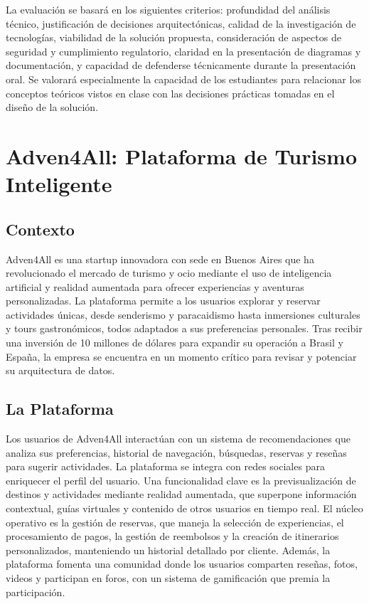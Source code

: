 \documentclass[12pt]{article}
\begin{document}
La evaluación se basará en los siguientes criterios: profundidad del análisis técnico, justificación de decisiones arquitectónicas, calidad de la investigación de tecnologías, viabilidad de la solución propuesta, consideración de aspectos de seguridad y cumplimiento regulatorio, claridad en la presentación de diagramas y documentación, y capacidad de defenderse técnicamente durante la presentación oral. Se valorará especialmente la capacidad de los estudiantes para relacionar los conceptos teóricos vistos en clase con las decisiones prácticas tomadas en el diseño de la solución.

\newpage

\section{Adven4All: Plataforma de Turismo Inteligente}

\subsection{Contexto}
Adven4All es una startup innovadora con sede en Buenos Aires que ha revolucionado el mercado de turismo y ocio mediante el uso de inteligencia artificial y realidad aumentada para ofrecer experiencias y aventuras personalizadas. La plataforma permite a los usuarios explorar y reservar actividades únicas, desde senderismo y paracaidismo hasta inmersiones culturales y tours gastronómicos, todos adaptados a sus preferencias personales. Tras recibir una inversión de 10 millones de dólares para expandir su operación a Brasil y España, la empresa se encuentra en un momento crítico para revisar y potenciar su arquitectura de datos.

\subsection{La Plataforma}
Los usuarios de Adven4All interactúan con un sistema de recomendaciones que analiza sus preferencias, historial de navegación, búsquedas, reservas y reseñas para sugerir actividades. La plataforma se integra con redes sociales para enriquecer el perfil del usuario. Una funcionalidad clave es la previsualización de destinos y actividades mediante realidad aumentada, que superpone información contextual, guías virtuales y contenido de otros usuarios en tiempo real. El núcleo operativo es la gestión de reservas, que maneja la selección de experiencias, el procesamiento de pagos, la gestión de reembolsos y la creación de itinerarios personalizados, manteniendo un historial detallado por cliente. Además, la plataforma fomenta una comunidad donde los usuarios comparten reseñas, fotos, videos y participan en foros, con un sistema de gamificación que premia la participación.
\end{document}

